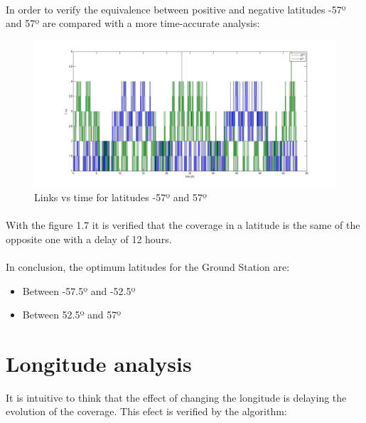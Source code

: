 \documentclass[12pt,a4paper]{report}
\begin{document}
\paragraph{}
In order to verify the equivalence between positive and negative latitudes -57º and 57º are compared with a more time-accurate analysis:

\begin{figure}[H]
\begin{center}
\includegraphics[scale=0.30]{-57_57_lat.jpg}
\caption{Links vs time for latitudes -57º and 57º}
\end{center}
\end{figure}

\paragraph{}
With the figure 1.7 it is verified that the coverage in a latitude is the same of the opposite one with a delay of 12 hours.
\paragraph{}
In conclusion, the optimum latitudes for the Ground Station are:
\begin{itemize}
\item Between -57.5º and -52.5º
\item Between 52.5º and 57º
\end{itemize}

\section{Longitude analysis}
It is intuitive to think that the effect of changing the longitude is delaying the evolution of the coverage. This efect is verified by the algorithm:
\end{document}
